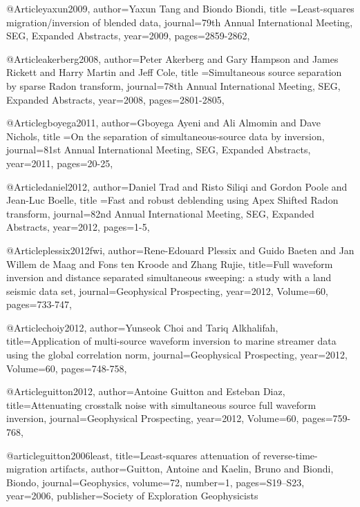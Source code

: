 @Article{yaxun2009,
  author={Yaxun Tang and Biondo Biondi},
  title ={Least-squares migration/inversion of blended data},
  journal={79th Annual International Meeting, SEG, Expanded Abstracts},
  year=2009,
  pages={2859-2862},
}

@Article{akerberg2008,
  author={Peter Akerberg and Gary Hampson and James Rickett and Harry Martin and Jeff Cole},
  title ={Simultaneous source separation by sparse Radon transform},
  journal={78th Annual International Meeting, SEG, Expanded Abstracts},
  year=2008,
  pages={2801-2805},
}

@Article{gboyega2011,
  author={Gboyega Ayeni and Ali Almomin and Dave Nichols},
  title ={On the separation of simultaneous-source data by inversion},
  journal={81st Annual International Meeting, SEG, Expanded Abstracts},
  year=2011,
  pages={20-25},
}

@Article{daniel2012,
  author={Daniel Trad and Risto Siliqi and Gordon Poole and Jean-Luc Boelle},
  title ={Fast and robust deblending using Apex Shifted Radon transform},
  journal={82nd Annual International Meeting, SEG, Expanded Abstracts},
  year=2012,
  pages={1-5},
}

@Article{plessix2012fwi,
  author={Rene-Edouard Plessix and Guido Baeten and Jan Willem de Maag and Fons ten Kroode and Zhang Rujie},
  title={Full waveform inversion and distance separated simultaneous sweeping: a study with a land seismic data set},
  journal={Geophysical Prospecting},
  year=2012,
  Volume=60,
  pages={733-747},
}

@Article{choiy2012,
  author={Yunseok Choi and Tariq Alkhalifah},
  title={Application of multi-source waveform inversion to marine streamer data using the global correlation norm},
  journal={Geophysical Prospecting},
  year=2012,
  Volume=60,
  pages={748-758},
}


@Article{guitton2012,
  author={Antoine Guitton and Esteban Diaz},
  title={Attenuating crosstalk noise with simultaneous source full waveform inversion},
  journal={Geophysical Prospecting},
  year=2012,
  Volume=60,
  pages={759-768},
}

@article{guitton2006least,
  title={Least-squares attenuation of reverse-time-migration artifacts},
  author={Guitton, Antoine and Kaelin, Bruno and Biondi, Biondo},
  journal={Geophysics},
  volume={72},
  number={1},
  pages={S19--S23},
  year={2006},
  publisher={Society of Exploration Geophysicists}
}

